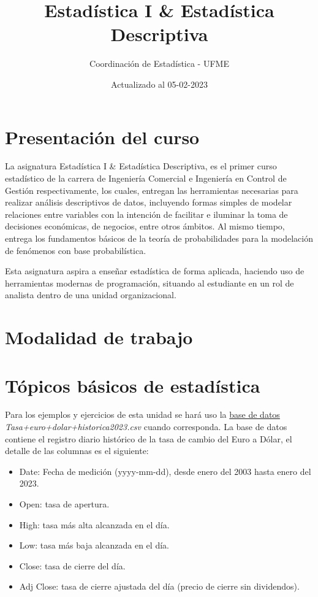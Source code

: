 \documentclass[
]{book}
\title{Estadística I \& Estadística Descriptiva}
\author{Coordinación de Estadística - UFME}
\date{Actualizado al 05-02-2023}
\providecommand{\tightlist}{%
  \setlength{\itemsep}{0pt}\setlength{\parskip}{0pt}}
\begin{document}
\maketitle

{
\setcounter{tocdepth}{1}
\tableofcontents
}
\hypertarget{presentaciuxf3n-del-curso}{%
\chapter*{Presentación del curso}\label{presentaciuxf3n-del-curso}}

La asignatura Estadística I \& Estadística Descriptiva, es el primer curso estadístico de la carrera de Ingeniería Comercial e Ingeniería en Control de Gestión respectivamente, los cuales, entregan las herramientas necesarias para realizar análisis descriptivos de datos, incluyendo formas simples de modelar relaciones entre variables con la intención de facilitar e iluminar la toma de decisiones económicas, de negocios, entre otros ámbitos. Al mismo tiempo, entrega los fundamentos básicos de la teoría de probabilidades para la modelación de fenómenos con base probabilística.

Esta asignatura aspira a enseñar estadística de forma aplicada, haciendo uso de herramientas modernas de programación, situando al estudiante en un rol de analista dentro de una unidad organizacional.

\hypertarget{modalidad-de-trabajo}{%
\chapter*{Modalidad de trabajo}\label{modalidad-de-trabajo}}

\hypertarget{unidad1}{%
\chapter{Tópicos básicos de estadística}\label{unidad1}}

Para los ejemplos y ejercicios de esta unidad se hará uso la \href{https://es.finance.yahoo.com/quote/EURUSD\%3DX?p=EURUSD\%3DX}{base de datos} \emph{Tasa+euro+dolar+historica2023.csv} cuando corresponda. La base de datos contiene el registro diario histórico de la tasa de cambio del Euro a Dólar, el detalle de las columnas es el siguiente:

\begin{itemize}
\tightlist
\item
  Date: Fecha de medición (yyyy-mm-dd), desde enero del 2003 hasta enero del 2023.
\item
  Open: tasa de apertura.
\item
  High: tasa más alta alcanzada en el día.
\item
  Low: tasa más baja alcanzada en el día.
\item
  Close: tasa de cierre del día.
\item
  Adj Close: tasa de cierre ajustada del día (precio de cierre sin dividendos).
\end{itemize}
\end{document}
